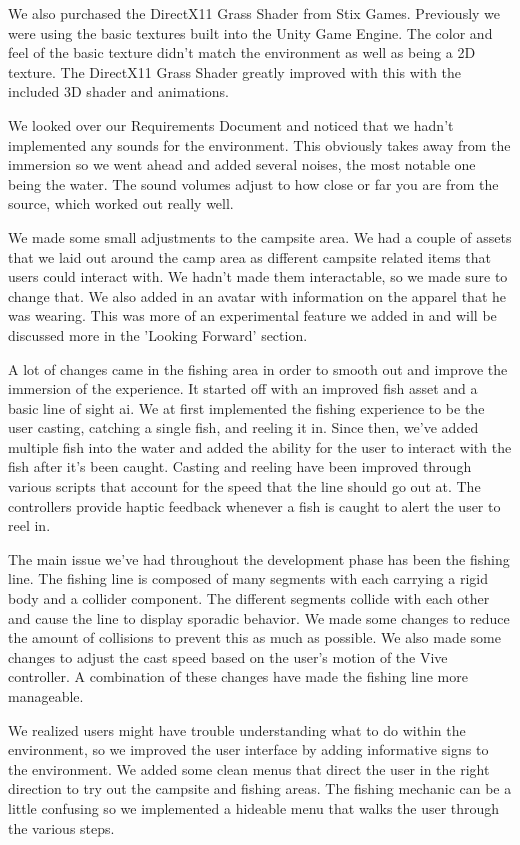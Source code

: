 \documentclass[10pt,journal,compsoc,onecolumn, draftclsnofoot]{IEEEtran}
\begin{document}
We also purchased the DirectX11 Grass Shader from Stix Games.
Previously we were using the basic textures built into the Unity Game Engine. The color and feel of the basic texture didn't match the environment as well as  being a 2D texture.
The DirectX11 Grass Shader greatly improved with this with the included 3D shader and animations.

We looked over our Requirements Document and noticed that we hadn't implemented any sounds for the environment.
This obviously takes away from the immersion so we went ahead and added several noises, the most notable one being the water.
The sound volumes adjust to how close or far you are from the source, which worked out really well.

We made some small adjustments to the campsite area.
We had a couple of assets that we laid out around the camp area as different campsite related items that users could interact with.
We hadn't made them interactable, so we made sure to change that.
We also added in an avatar with information on the apparel that he was wearing. This was more of an experimental feature we added in and will be discussed more in the 'Looking Forward' section.

A lot of changes came in the fishing area in order to smooth out and improve the immersion of the experience.
It started off with an improved fish asset and a basic line of sight ai.
We at first implemented the fishing experience to be the user casting, catching a single fish, and reeling it in.
Since then, we've added multiple fish into the water and added the ability for the user to interact with the fish after it's been caught.
Casting and reeling have been improved through various scripts that account for the speed that the line should go out at.
The controllers provide haptic feedback whenever a fish is caught to alert the user to reel in.

The main issue we've had throughout the development phase has been the fishing line.
The fishing line is composed of many segments with each carrying a rigid body and a collider component.
The different segments collide with each other and cause the line to display sporadic behavior.
We made some changes to reduce the amount of collisions to prevent this as much as possible.
We also made some changes to adjust the cast speed based on the user's motion of the Vive controller.
A combination of these changes have made the fishing line more manageable.

We realized users might have trouble understanding what to do within the environment, so we improved the user interface by adding informative signs to the environment.
We added some clean menus that direct the user in the right direction to try out the campsite and fishing areas.
The fishing mechanic can be a little confusing so we implemented a hideable menu that walks the user through the various steps.
\end{document}
